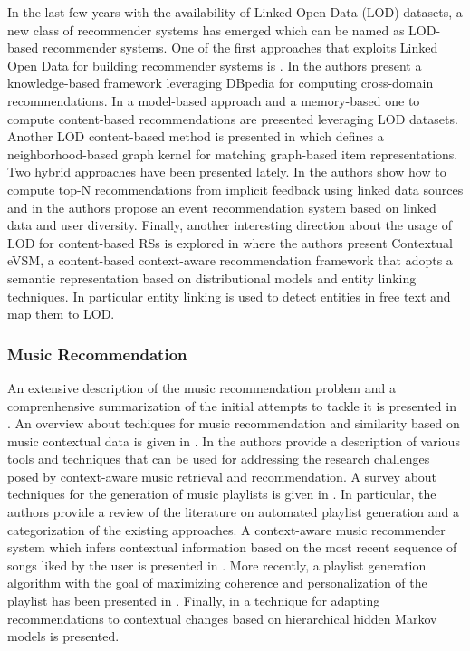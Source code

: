 In the last few years with the availability of Linked Open Data (LOD) datasets, a new class of recommender systems has emerged which can be named as LOD-based recommender systems. 
One of the first approaches that exploits Linked Open Data for building recommender systems is \citep{HeitmannH10}. 
In \citep{Fernandez-Tobias2011} the authors present a knowledge-based framework leveraging DBpedia for computing cross-domain recommendations. 
In \citep{DMOR12,DMORZ12} a model-based approach and a memory-based one to compute content-based recommendations are presented leveraging LOD datasets. Another LOD content-based method is presented in \citep{ODMD14a} which defines a neighborhood-based graph kernel for matching graph-based item representations. 
Two hybrid approaches have been presented lately. In \citep{Ostuni2013} the authors show how to compute top-N recommendations from implicit feedback using linked data sources and in \citep{Khrouf2013} the authors propose an event recommendation system based on linked data and user diversity. 
Finally, another interesting direction about the usage of LOD for content-based RSs is explored in \citep{MustoSLG14} where the authors present Contextual eVSM, a content-based context-aware recommendation framework that adopts a semantic representation based on distributional models and entity linking techniques. In particular entity linking is used to detect entities in free text and map them to LOD.


\subsubsection{Music Recommendation}
\label{sec:SOA:mir:recommendation:music}

An extensive description of the music recommendation problem and a comprenhensive summarization of the initial attempts to tackle it is presented in \citep{Celma2010}. An overview about techiques for music recommendation and similarity based on music contextual data is given in \citep{Knees2013}. 
In \citep{KaminskasR12} the authors provide a description of various tools and techniques that can be used for addressing the research
challenges posed by context-aware music retrieval and recommendation. 
A survey about techniques for the generation of music playlists is given in \citep{Bonnin2014}. In particular, the authors provide a review of the literature on automated playlist generation and a categorization of the existing approaches. 
A context-aware music recommender system which infers contextual information based on the most recent sequence of songs liked by the user is presented in \citep{HaririMB12}.
More recently, a playlist generation algorithm with the goal of maximizing coherence and personalization of the playlist has been presented in \citep{Jannach2015}. Finally, in \citep{AghdamHMB15} a technique for adapting recommendations to contextual changes based on hierarchical hidden Markov models is presented.

